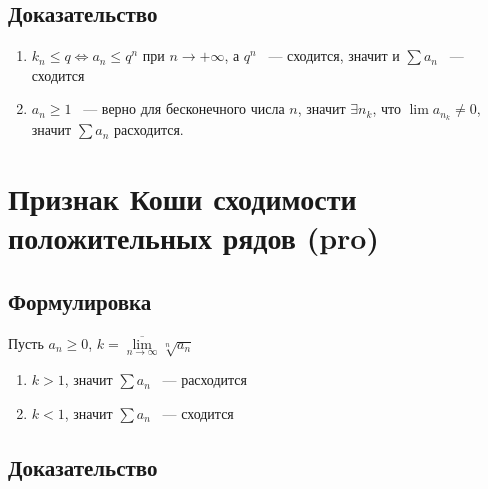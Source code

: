 \documentclass{article}
\begin{document}
        \subsection{Доказательство}
        
            \begin{enumerate}
            
                \item $k_n \leq q \Longleftrightarrow a_n \leq q^n$ при $n \rightarrow +\infty$, а $q^n$ ~--- сходится, значит и $\sum a_n$ ~--- сходится
                
                \item $a_n \geq 1$ ~--- верно для бесконечного числа $n$, значит $\exists n_k$, что $\lim a_{n_k} \neq 0$, значит $\sum a_n$ расходится.
                
            \end{enumerate}
            
    \newpage
    
    \section{Признак Коши сходимости положительных рядов (pro)}
    
        \subsection{Формулировка}
        
            Пусть $a_n \geq 0$, $k = \overline{\lim\limits_{n \rightarrow \infty}} \sqrt[n]{a_n}$
            
            \begin{enumerate}
            
                \item $k > 1$, значит $\sum a_n$ ~--- расходится
                
                \item $k < 1$, значит $\sum a_n$ ~--- сходится
                
            \end{enumerate}
            
        \subsection{Доказательство}
        
\end{document}
